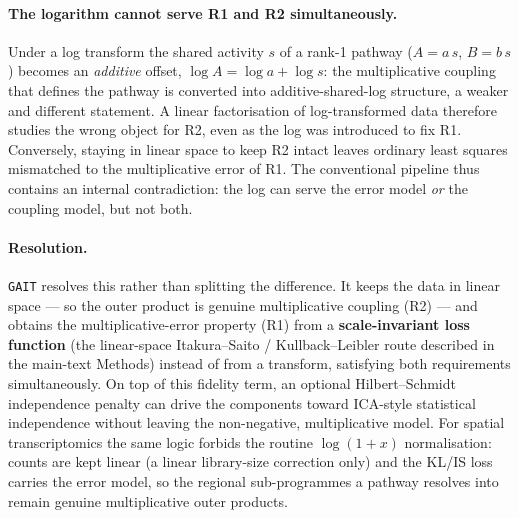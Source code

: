 \documentclass[11pt]{article}
\newcommand{\code}[1]{\texttt{#1}}
\begin{document}
\paragraph{The logarithm cannot serve R1 and R2 simultaneously.} Under a log transform the
shared activity $s$ of a rank-1 pathway ($A = a\,s$, $B = b\,s$) becomes an \emph{additive}
offset, $\log A = \log a + \log s$: the multiplicative coupling that defines the pathway is
converted into additive-shared-log structure, a weaker and different statement. A linear
factorisation of log-transformed data therefore studies the wrong object for R2, even as the
log was introduced to fix R1. Conversely, staying in linear space to keep R2 intact leaves
ordinary least squares mismatched to the multiplicative error of R1. The conventional pipeline
thus contains an internal contradiction: the log can serve the error model \emph{or} the
coupling model, but not both.

\paragraph{Resolution.} \code{GAIT} resolves this rather than splitting the difference.
It keeps the data in linear space --- so the outer product is genuine multiplicative coupling
(R2) --- and obtains the multiplicative-error property (R1) from a \textbf{scale-invariant
loss function} (the linear-space Itakura--Saito / Kullback--Leibler route described in the
main-text Methods) instead of from a transform, satisfying both requirements simultaneously.
On top of this fidelity term, an optional Hilbert--Schmidt independence penalty can drive the
components toward ICA-style statistical independence without leaving the non-negative,
multiplicative model. For spatial transcriptomics the same logic forbids the routine
$\log(1+x)$ normalisation: counts are kept linear (a linear library-size correction only) and
the KL/IS loss carries the error model, so the regional sub-programmes a pathway resolves into
remain genuine multiplicative outer products.
\end{document}

